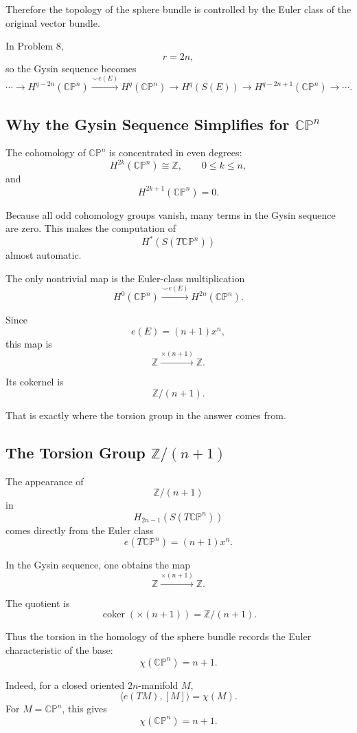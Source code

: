 \documentclass[12pt,a4paper]{article}
\theoremstyle{notespace}
\begin{document}
Therefore the topology of the sphere bundle is controlled by the Euler class of
the original vector bundle.

In Problem 8,
\[
r=2n,
\]
so the Gysin sequence becomes
\[
\cdots
\to
H^{q-2n}(\mathbb{CP}^n)
\xrightarrow{\smile e(E)}
H^q(\mathbb{CP}^n)
\to
H^q(S(E))
\to
H^{q-2n+1}(\mathbb{CP}^n)
\to
\cdots.
\]

\subsection{Why the Gysin Sequence Simplifies for \(\mathbb{CP}^n\)}

The cohomology of \(\mathbb{CP}^n\) is concentrated in even degrees:
\[
H^{2k}(\mathbb{CP}^n)\cong \mathbb Z,
\qquad
0\le k\le n,
\]
and
\[
H^{2k+1}(\mathbb{CP}^n)=0.
\]

Because all odd cohomology groups vanish, many terms in the Gysin sequence are
zero. This makes the computation of
\[
H^*(S(T\mathbb{CP}^n))
\]
almost automatic.

The only nontrivial map is the Euler-class multiplication
\[
H^0(\mathbb{CP}^n)
\xrightarrow{\smile e(E)}
H^{2n}(\mathbb{CP}^n).
\]

Since
\[
e(E)=(n+1)x^n,
\]
this map is
\[
\mathbb Z\xrightarrow{\times(n+1)}\mathbb Z.
\]

Its cokernel is
\[
\mathbb Z/(n+1).
\]

That is exactly where the torsion group in the answer comes from.

\subsection{The Torsion Group \(\mathbb Z/(n+1)\)}

The appearance of
\[
\mathbb Z/(n+1)
\]
in
\[
H_{2n-1}(S(T\mathbb{CP}^n))
\]
comes directly from the Euler class
\[
e(T\mathbb{CP}^n)=(n+1)x^n.
\]

In the Gysin sequence, one obtains the map
\[
\mathbb Z
\xrightarrow{\times(n+1)}
\mathbb Z.
\]

The quotient is
\[
\operatorname{coker}(\times(n+1))
=
\mathbb Z/(n+1).
\]

Thus the torsion in the homology of the sphere bundle records the Euler
characteristic of the base:
\[
\chi(\mathbb{CP}^n)=n+1.
\]

Indeed, for a closed oriented \(2n\)-manifold \(M\),
\[
\langle e(TM),[M]\rangle=\chi(M).
\]
For \(M=\mathbb{CP}^n\), this gives
\[
\chi(\mathbb{CP}^n)=n+1.
\]
\end{document}
